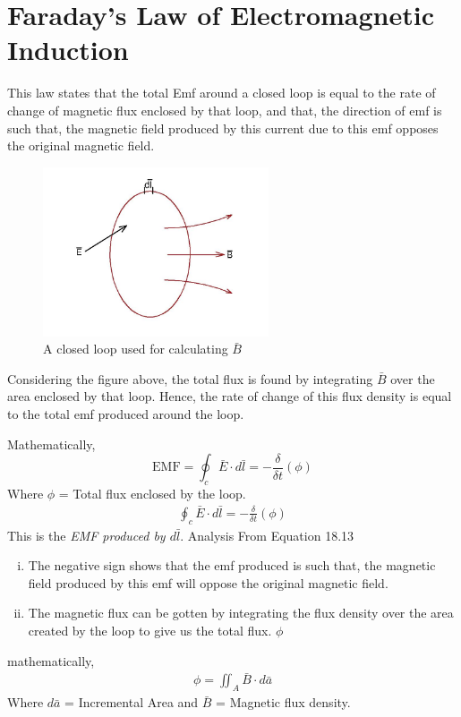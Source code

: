 \section{Faraday's Law of Electromagnetic Induction} 
This law states that the total Emf around a closed loop is equal to the rate of change of magnetic flux enclosed by that loop, and that, the direction of emf is such that, the magnetic field produced by this current due to this emf opposes the original magnetic field.
\begin{figure}[h]
\centering
\includegraphics[height=5cm]{./graphics/k}
\caption{A closed loop used for calculating $\bar{B}$}
\label{fig:k}
\end{figure}

Considering the figure above, the total flux is found by integrating $\bar{B}$ over the area enclosed by that loop. Hence, the rate of change of this flux density is equal to the total emf produced around the loop.

Mathematically,
\begin{dmath}
\text{EMF} = \oint_c\bar{E} \cdot d\bar{l} = -\frac{\delta}{\delta t}(\phi)
\end{dmath}
Where $\phi$ = Total flux enclosed by the loop.
\begin{align}
\boxed{\oint_c\bar{E} \cdot d\bar{l} = -\frac{\delta}{\delta t}(\phi)}
\end{align}
This is the \emph{EMF produced by $d\bar{l}$}. Analysis From Equation 18.13
\begin{enumerate}[(i)]
\item The negative sign shows that the emf produced is such that, the magnetic field produced by this emf will oppose the original magnetic field. 
\item The magnetic flux can be gotten by integrating the flux density over the area created by the loop to give us the total flux. $\phi$ 
\end{enumerate}
mathematically,
\begin{align}
\phi = \iint_A\bar{B} \cdot d\bar{a}
\end{align}
Where $d\bar{a}$ = Incremental Area and $\bar{B}$ = Magnetic flux density.


